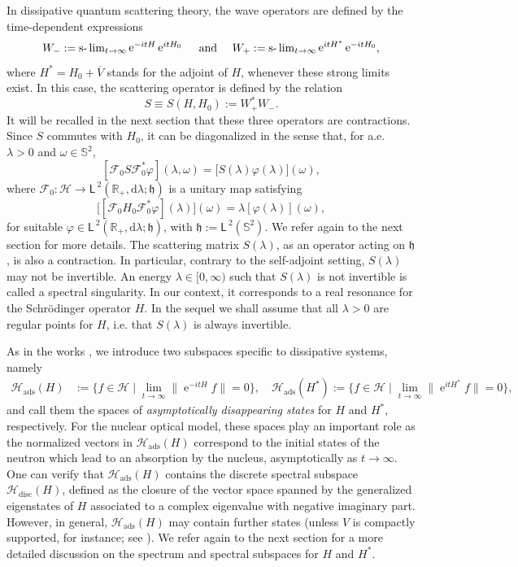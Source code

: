 \documentclass{article}
\def\d{\mathrm{d}}
\def\F{\mathscr F}
\def\H{\mathcal H}
\def\R{\mathbb R}
\def\S{\mathbb S}
\def\HS{\mathfrak h}
\def\ltwo{\mathsf{L}^{\:\!\!2}}
\def\e{\mathop{\mathrm{e}}\nolimits}
\def\slim{\mathop{\hbox{\rm s-}\lim}\nolimits}
\def\disc{{\mathrm{disc}}}
\def\ads{{\mathrm{ads}}}
\begin{document}
In dissipative quantum scattering theory, the wave operators are defined by the time-dependent expressions
\begin{equation}\label{eq:waveintro}
W_-:=\slim_{t\to \infty}\e^{-itH} \e^{itH_0}\quad  \hbox{ and }\quad 
W_+:=\slim_{t\to \infty} \e^{itH^*}\e^{-itH_0},
\end{equation}
where $H^*=H_0+\overline{V}$ stands for the adjoint of $H$, whenever these strong limits exist. 
In this case, the scattering operator is defined by the relation
\begin{equation}\label{eq:scatt_operator_intro}
S\equiv S(H,H_0):= W_+^* W_-.
\end{equation}
It will be recalled in the next section that these three operators are contractions. Since $S$ commutes with $H_0$, 
it can be diagonalized in the sense that, for a.e.~$\lambda>0$ and $\omega\in\S^2$,
$$
[\F_0 S \F_0^*\varphi](\lambda,\omega) =\big[S(\lambda)\varphi(\lambda)\big](\omega),
$$
where $\F_0:\H\to \ltwo(\R_+, \d \lambda; \HS)$ is a unitary map satisfying 
$$
\big[[\F_0 H_0 \F_0^*\varphi](\lambda)\big]( \omega) = \lambda [\varphi(\lambda)](\omega),
$$
for suitable $\varphi \in \ltwo(\R_+, \d \lambda; \HS)$, with $\HS:=\ltwo(\S^2)$. 
We refer again to the next section for more details. 
The scattering matrix $S(\lambda)$, as an operator acting on $\HS$, is also a contraction. 
In particular, contrary to the self-adjoint setting, $S(\lambda)$ may not be invertible. 
An energy $\lambda\in[0,\infty)$ such that $S(\lambda)$ is not invertible is called a spectral singularity. 
In our context, it corresponds to a real resonance for the Schr\"odinger operator $H$. 
In the sequel we shall assume that all $\lambda>0$ are regular points for $H$, 
i.e. that $S(\lambda)$ is always invertible.

As in the works \cite{FaFr18,FN}, we introduce two subspaces specific to dissipative systems, namely
\begin{align}\label{eq:def_Hads}
\H_\ads(H) & :=\big\{f\in \H\mid \lim_{t\to \infty}\|\e^{-itH} f\|=0\big\}, 
\quad \H_\ads(H^*) :=\big\{f\in \H\mid \lim_{t\to \infty}\|\e^{itH^*} f\|=0\big\}, 
\end{align}
and call them the spaces of \emph{asymptotically disappearing states} for $H$ and $H^*$, respectively. 
For the nuclear optical model, these spaces play an important role as the normalized vectors in $\H_\ads(H)$ 
correspond to the initial states of the neutron which lead to an absorption by the nucleus, 
asymptotically as $t\to\infty$. 
One can verify that $\H_\ads(H)$ contains the discrete spectral subspace $\H_\disc(H)$, defined as the closure of the vector space spanned by the generalized 
eigenstates of $H$ associated to a complex eigenvalue with negative imaginary part.
However, in general, $\H_\ads(H)$ may contain further states (unless $V$ is compactly supported, for instance; see \cite{FaFr18,FN}). 
We refer again to the next section for a more detailed discussion on the spectrum and spectral subspaces for $H$ and $H^*$.
\end{document}

